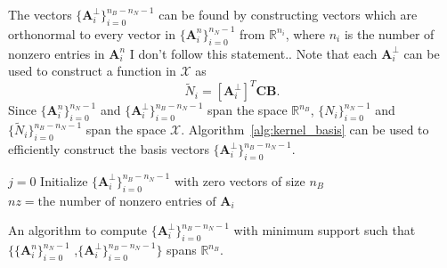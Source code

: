 The vectors $\{\mathbf{A}^\perp_i\}_{i=0}^{n_B-n_N-1}$ can be found by constructing vectors which are orthonormal to every vector in $\{\mathbf{A}^n_i\}_{i=0}^{n_N-1}$ from $\mathbb{R}^{n_i}$, where $n_i$ is the number of nonzero entries in $\mathbf{A}^n_i${\color{red} I don't follow this statement.}. Note that each $\mathbf{A}^\perp_i$ can be used to construct a function in $\mathcal{X}$ as
\begin{equation}
	\tilde{N}_i=\left[\mathbf{A}^\perp_i\right]^T \mathbf{CB}.\label{eq:tidle-spline-basis}
\end{equation}
Since $\{\mathbf{A}^n_i\}_{i=0}^{n_N-1}$ and $\{\mathbf{A}^\perp_i\}_{i=0}^{n_B-n_N-1}$ span the space $\mathbb{R}^{n_B}$, $\{N_i\}_{i=0}^{n_N-1}$ and $\{\tilde{N}_i\}_{i=0}^{n_B-n_N-1}$ span the space $\mathcal{X}$. Algorithm~\ref{alg:kernel_basis} can be used to efficiently construct the basis vectors $\{\mathbf{A}^\perp_i\}_{i=0}^{n_B-n_N-1}$.\par


\begin{algorithm}[H]\label{alg:kernel_basis}

	\BlankLine
	$j=0$\;
	Initialize $\{\mathbf{A}^\perp_i\}_{i=0}^{n_B-n_N-1}$ with zero vectors of size $n_B$\;
	{
		$nz=\text{the number of nonzero entries of }\mathbf{A}_i$\;
		{
		}
	}
	\caption{An algorithm to compute $\{\mathbf{A}^\perp_i\}_{i=0}^{n_B-n_N-1}$ with minimum support such that $\{\{\mathbf{A}^n_i\}_{i=0}^{n_N-1}$  ,$\{\mathbf{A}^\perp_i\}_{i=0}^{n_B-n_N-1}\}$ spans $\mathbb{R}^{n_B}$.}
\end{algorithm}

